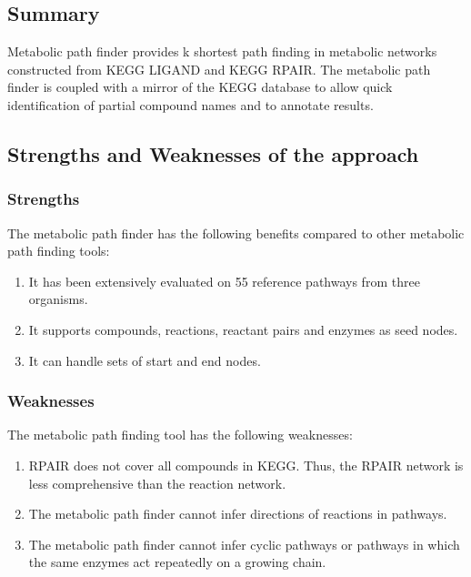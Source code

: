 \subsection{Summary}

Metabolic path finder provides k shortest path finding in metabolic networks constructed from KEGG LIGAND and KEGG RPAIR.
The metabolic path finder is coupled with a mirror of the KEGG database to allow quick identification of partial compound
names and to annotate results.

\subsection{Strengths and Weaknesses of the approach}

\subsubsection{Strengths}
The metabolic path finder has the following benefits compared to other metabolic path finding tools:
\begin{enumerate}

\item It has been extensively evaluated on 55 reference pathways from three organisms.

\item It supports compounds, reactions, reactant pairs and enzymes as seed nodes.

\item It can handle sets of start and end nodes.

\end{enumerate}

\subsubsection{Weaknesses}
The metabolic path finding tool has the following weaknesses:

\begin{enumerate}

\item RPAIR does not cover all compounds in KEGG. Thus, the RPAIR network is less comprehensive than the reaction network.

\item The metabolic path finder cannot infer directions of reactions in pathways.

\item The metabolic path finder cannot infer cyclic pathways or pathways in which the same enzymes act repeatedly on a growing chain.

\end{enumerate}


